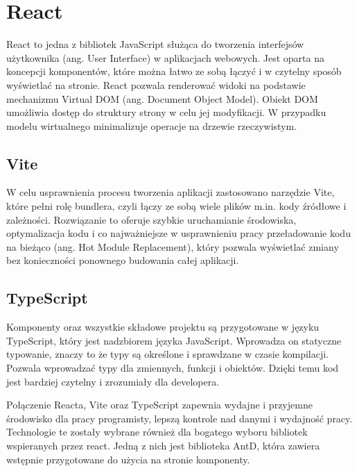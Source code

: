 \section{React}
React to jedna z bibliotek JavaScript służąca do tworzenia interfejsów użytkownika (ang. User Interface) w aplikacjach webowych. Jest oparta na koncepcji komponentów, które można łatwo ze sobą łączyć i w czytelny sposób wyświetlać na stronie. React pozwala renderować widoki na podstawie mechanizmu Virtual DOM (ang. Document Object Model). Obiekt DOM umożliwia dostęp do struktury strony w celu jej modyfikacji. W przypadku modelu wirtualnego minimalizuje operacje na drzewie rzeczywistym. 
\subsection*{Vite}
W celu usprawnienia procesu tworzenia aplikacji zastosowano narzędzie Vite, które pełni rolę bundlera, czyli łączy ze sobą wiele plików m.in. kody źródłowe i zależności. Rozwiązanie to oferuje szybkie uruchamianie środowiska, optymalizacja kodu i co najważniejsze w usprawnieniu pracy przeładowanie kodu na bieżąco (ang. Hot Module Replacement), który pozwala wyświetlać zmiany bez konieczności ponownego budowania całej aplikacji. 
\subsection*{TypeScript}
Komponenty oraz wszystkie składowe projektu są przygotowane w języku TypeScript, który jest nadzbiorem języka JavaScript. Wprowadza on statyczne typowanie, znaczy to że typy są określone i sprawdzane w czasie kompilacji. Pozwala wprowadzać typy dla zmiennych, funkcji i obiektów. Dzięki temu kod jest bardziej czytelny i zrozumiały dla developera. 
\newline

Połączenie Reacta, Vite oraz TypeScript zapewnia wydajne i przyjemne środowisko dla pracy programisty, lepszą kontrole nad danymi i wydajność pracy. Technologie te zostały wybrane również dla bogatego wyboru bibliotek wspieranych przez react. Jedną z nich jest biblioteka AntD, która zawiera wstępnie przygotowane do użycia na stronie komponenty. 